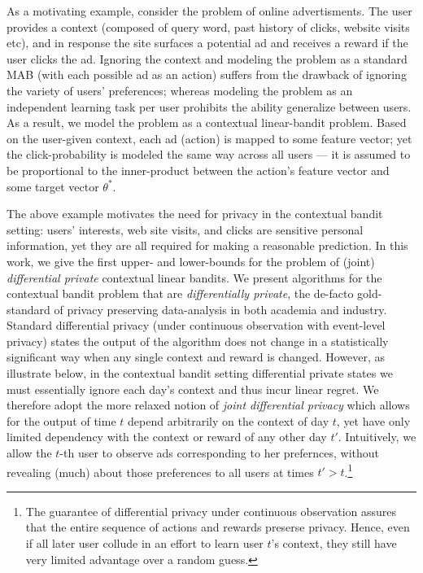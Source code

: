 \documentclass{article}
\begin{document}
As a motivating example, consider the problem of online advertisments. The user provides a context (composed of query word, past history of clicks, website visits etc), and in response the site surfaces a potential ad and receives a reward if the user clicks the ad. Ignoring the context and modeling the problem as a standard MAB (with each possible ad as an action) suffers from the drawback of ignoring the variety of users' preferences; whereas modeling the problem as an independent learning task per user prohibits the ability generalize between users. As a result, we model the problem as a contextual linear-bandit problem. Based on the user-given context, each ad (action) is mapped to some feature vector; yet the click-probability is modeled the same way across all users --- it is assumed to be proportional to the inner-product between the action's feature vector and some target vector $\theta^*$.

The above example motivates the need for privacy in the contextual bandit setting: users' interests, web site visits, and clicks are
sensitive personal information, yet they are all required for making a reasonable prediction.
In this work, we give the first upper- and lower-bounds for the problem of (joint) \emph{differential private} contextual linear bandits. We present algorithms for the contextual bandit problem that are
\emph{differentially private}, the de-facto gold-standard of privacy
preserving data-analysis in both academia and industry. Standard differential privacy (under continuous observation with event-level privacy) states the
output of the algorithm does not change in a statistically significant
way when any single context and reward is changed. However, as illustrate below, in the contextual bandit setting differential
private states we must essentially ignore each day's context and thus incur linear regret. We therefore adopt the
more relaxed notion of \emph{joint differential privacy} \citep{KearnsMechanismDesign2014} which allows
for the output of time $t$ depend arbitrarily on the context of day $t$, yet have only limited dependency with the context or reward of any other day $t'$. Intuitively, we allow the $t$-th user to observe ads corresponding to her prefernces, without revealing (much) about those preferences to all users at times $t'>t$.\footnote{The guarantee of differential privacy under continuous observation assures that the entire sequence of actions and rewards preserse privacy. Hence, even if all later user collude in an effort to learn user $t$'s context, they still have very limited advantage over a random guess.}
\end{document}
